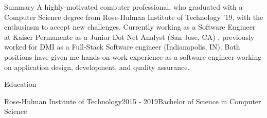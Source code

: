 \documentclass{resume} %
\begin{document}
\begin{rSection}{Summary}
{A highly-motivated computer professional, who graduated with a Computer Science degree from Rose-Hulman Institute of Technology '19, with the enthusiasm to accept new challenges. Currently working as a Software Engineer at Kaiser Permanente as a Junior Dot Net Analyst (San Jose, CA) , previously worked for DMI as a Full-Stack Software engineer (Indianapolis, IN). Both positions have given me hands-on work experience as a software engineer working on application design, development, and quality assurance.}
\end{rSection}

\begin{rSection}{Education}
\begin{rsemisection}{Rose-Hulman Institute of Technology}{2015 - 2019}{Bachelor of Science in Computer Science}
\end{rsemisection}
\end{rSection}
\end{document}
